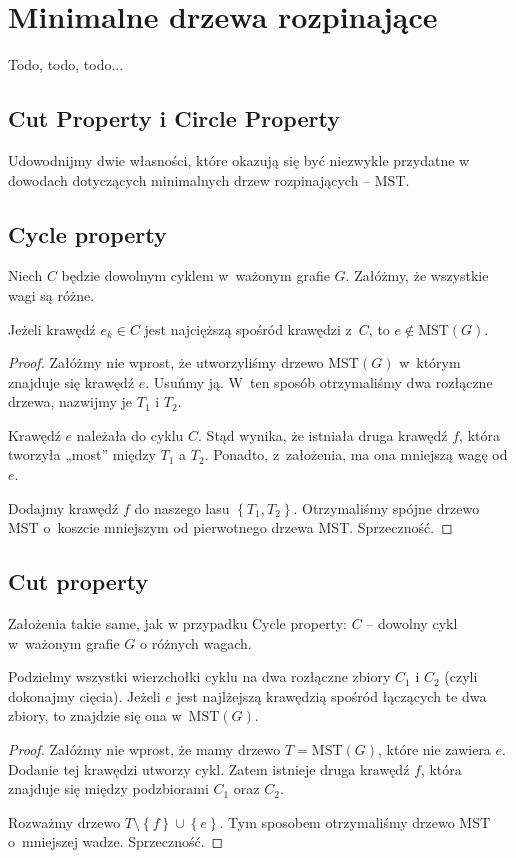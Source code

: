 \section{Minimalne drzewa rozpinające}

\label{sec:mst}

Todo, todo, todo...

\subsection{Cut Property i Circle Property}

Udowodnijmy dwie własności, które okazują się być niezwykle przydatne w dowodach dotyczących minimalnych drzew rozpinających – MST.

\subsection{Cycle property}
    Niech $C$ będzie dowolnym cyklem w~ważonym grafie $G$. Załóżmy, że wszystkie wagi są różne.
\begin{theorem}
   Jeżeli krawędź $e_k \in C$ jest najcięższą spośród krawędzi z~$C$, to $e \notin \text{MST}\left( G \right)$.
\end{theorem}
\begin{proof}
    Załóżmy nie wprost, że utworzyliśmy drzewo $\text{MST}\left( G \right)$ w~którym znajduje się krawędź $e$. Usuńmy ją. W~ten sposób otrzymaliśmy dwa rozłączne drzewa, nazwijmy je $T_1$ i $T_2$.
    
    Krawędź $e$ należała do cyklu $C$. Stąd wynika, że istniała druga krawędź $f$, która tworzyła „most” między $T_1$ a $T_2$. Ponadto, z~założenia, ma ona mniejszą wagę od $e$. 
    
    Dodajmy krawędź $f$ do naszego lasu $ \left\{ T_{1},T_{2}\right\} $. Otrzymaliśmy spójne drzewo MST o~koszcie mniejszym od pierwotnego drzewa MST. Sprzeczność.
\end{proof}

\subsection{Cut property}
    Założenia takie same, jak w przypadku Cycle property: $C$ – dowolny cykl w~ważonym grafie $G$ o różnych wagach.
\begin{theorem}
   Podzielmy wszystki wierzchołki cyklu na dwa rozłączne zbiory $C_1$ i $C_2$ (czyli dokonajmy cięcia). Jeżeli $e$ jest najlżejszą krawędzią spośród łączących te dwa zbiory, to znajdzie się ona w~$\text{MST}\left( G \right) $.
\end{theorem}
\begin{proof}
    Załóżmy nie wprost, że mamy drzewo $T = \text{MST}\left( G \right) $, które nie zawiera $ e $. Dodanie tej krawędzi utworzy cykl. Zatem istnieje druga krawędź $ f $, która znajduje się między podzbiorami $ C_{1} $ oraz $ C_{2} $.
    
    Rozważmy drzewo $ T \setminus \left\{ f \right\} \cup \left\{ e \right\} $. Tym sposobem otrzymaliśmy drzewo MST o~mniejszej wadze. Sprzeczność.
\end{proof}

